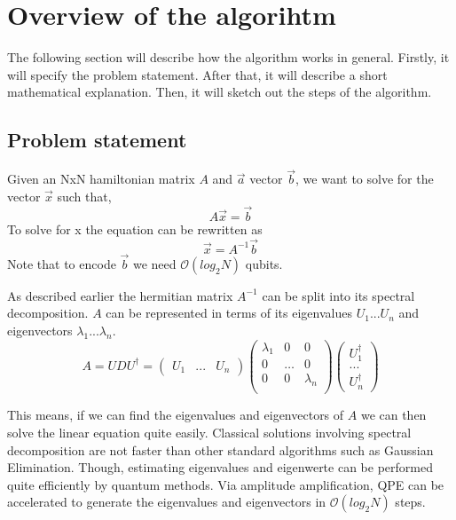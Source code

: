 \section{ Overview of the algorihtm }
The following section will describe how the algorithm works in general.
Firstly, it will specify the problem statement. 
After that, it will describe a short mathematical explanation. 
Then, it will sketch out the steps of the algorithm.

\subsection{Problem statement}

Given an NxN hamiltonian matrix $A$ and $\vec a$ vector $\vec b$, we want to solve for the vector $\vec x$ such that,
\begin{equation}
A \vec{x} = \vec{b}
\end{equation}
To solve for x the equation can be rewritten as
\begin{equation}
\vec{x} = A^{-1}\vec{b}
\end{equation}
Note that to encode $\vec b$ we need $\mathcal{O}(log_2 N)$ qubits.

As described earlier the hermitian matrix $A^{-1}$ can be split into its spectral decomposition. 
$A$ can be represented in terms of its eigenvalues $U_1 ... U_n$ and eigenvectors $\lambda_1 ... \lambda_n$.
\begin{equation} 
A =  U D U^{\dagger} = \begin{pmatrix} U_1 & ...& U_n \end{pmatrix} \begin{pmatrix} \lambda_1 & 0 & 0 \\  0 & \dots & 0\\ 0 & 0& \lambda_n \\ \end{pmatrix} \begin{pmatrix} U^\dagger_1 \\ ...\\ U^\dagger_n \end{pmatrix}
\end{equation}

This means, if we can find the eigenvalues and eigenvectors of $A$ we can then solve the linear equation quite easily. 
Classical solutions involving spectral decomposition are not faster than other standard algorithms such as Gaussian Elimination. 
Though, estimating eigenvalues and eigenwerte can be performed quite efficiently by quantum methods.
Via amplitude amplification, QPE can be accelerated to generate the eigenvalues and eigenvectors in $\mathcal{O}(log_2 N)$ steps.

